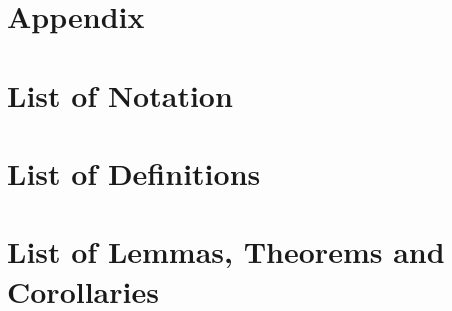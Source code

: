 \newpage
\appendix
\section*{Appendix}




\section{List of Notation}

\section{List of Definitions}

\section{List of Lemmas, Theorems and Corollaries}
